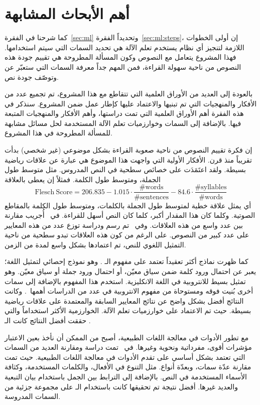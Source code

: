 \section{أهم الأبحاث المشابهة}
كما شرحنا في الفقرة~\ref{sec:ml} وتحديداً الفقرة~\ref{sec:ml:steps}، إن أولى الخطوات اللازمة لتنجيز أي نظام يستخدم تعلم الآلة
هي تحديد السمات التي سيتم استخدامها.
فهذا المشروع يتعامل مع النصوص وكون المسألة المطروحة هي تقييم جودة هذه النصوص من ناحية سهولة القراءة،
فمن المهم جداً معرفة السمات التي ستعبّر عن وتوصّف جودة نص.

بالعودة إلى العديد من الأوراق العلمية التي تتقاطع مع هذا المشروع،
تم تجميع عدد من الأفكار والمنهجيات التي تم تبنيها والاعتماد عليها كإطار عمل ضمن المشروع.
سنذكر في هذه الفقرة أهم الأوراق العلمية التي تمت دراستها،
وأهم الأفكار والمنهجيات المتبعة فيها.
بالإضافة إلى السمات وخوارزميات تعلم الآلة المستخدمة لحل مسائل مشابهة للمسألة المطروحة في هذا المشروع.

إن فكرة تقييم النصوص من ناحية صعوبة القراءة بشكل موضوعي (غير شخصي) بدأت تقريباً منذ قرن.
الأفكار الأولية التي واجهت هذا الموضوع هي عبارة عن علاقات رياضية بسيطة.
ولقد اعتَمَدَت على خصائص سطحية في النص المدروس.
مثل متوسط طول الجملة، ومتوسط طول الكلمة.
فمثلاً إن  يعطى بالعلاقة
$$ \mathrm{Flesch\ Score} = 206.835 -
1.015 \cdot \frac{\mathrm{\# words}}{\mathrm{\# sentences}}
- 84.6 \cdot \frac{\mathrm{\# syllables}}{\mathrm{\# words}} $$
أي يمثل علاقة خطية لمتوسط طول الجملة بالكلمات، ومتوسط طول الكلمة بالمقاطع الصوتية.
وكلما كان هذا المقدار أكبر، كلما كان النص أسهل للقراءة.
في~\cite{dubay2007} أُجريب مقارنة بين عدد واسع من هذه العلاقات.
وفي~\cite{readability-scores-gutenberg} تم رسم ودراسة توزع عدد من هذه المعايير على عدد كبير من النصوص.
على الرغم من كون هذه العلاقات تبدو سطحية من ناحية التمثيل اللغوي للنص،
تم اعتمادها بشكل واسع لمدة من الزمن.

كما ظهرت نماذج أكثر تعقيداً تعتمد على مفهوم الـ .
وهو نموذج إحصائي لتمثيل اللغة؛ يعبر عن احتمال ورود كلمة ضمن سياق معيّن، أو احتمال ورود جملة أو سياق معيّن.
وهو تمثيل بسيط للانتروبية في اللغة الانكليزية.
استخدم هذا المفهوم بالإضافة إلى سمات أخرى بُنيت فوقه ومستوحاة من مفهوم الانتروبية في عدد من الدراسات
أهمها~\cite{schwarm2005, petersen2009}.
وكانت النتائج أفضل بشكل واضح عن نتائج المعايير السابقة والمعتمدة على علاقات رياضية بسيطة.
حيث تم الاعتماد على خوارزميات تعلم الآلة.
الخوارزمية الأكثر استخداماً والتي حققت أفضل النتائج كانت الـ .

مع تطور الأدوات في معالجة اللغات الطبيعية، أصبح من الممكن أن نأخذ بعين الاعتبار مؤشرات أقوى، مفرداتية ونحوية وغيرها.
في~\cite{feng-phd, feng2010comparison} تمت دراسة ومقارنة العديد من السمات
التي تعتمد بشكل أساسي على تقدم الأدوات في معالجة اللغات الطبيعية.
حيث تمت مقارنة عدّة سمات، وبعدّة أنواع.
مثل التنوع في الأفعال، والكلمات المستخدمة، وكثافة الأسماء المستخدمة في النص.
بالإضافة إلى الترابط بين الجمل باستخدام بيان التبعية والعديد غيرها.
أفضل نتيجة تم تحقيقها كانت باستخدام الـ  على مجموعة جزئية من السمات المدروسة.

